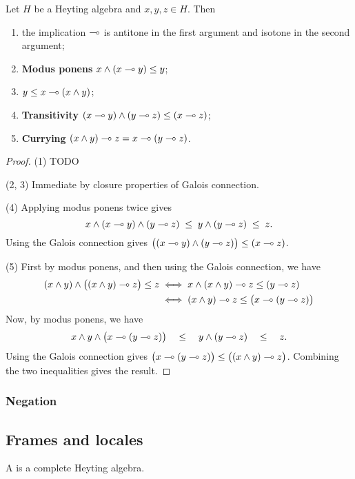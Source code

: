 \begin{lemma}
Let $H$ be a Heyting algebra and $x,y,z\in H$. Then
\begin{enumerate}
\item the implication $\multimap$ is antitone in the first argument and isotone in the second argument;
\item \textbf{Modus ponens} $x\wedge (x\multimap y) \leq y$;
\item $y\leq x \multimap (x\wedge y)$;
\item \textbf{Transitivity} $(x\multimap y)\wedge (y\multimap z) \leq (x\multimap z)$;
\item \textbf{Currying} $(x\wedge y) \multimap z = x \multimap (y\multimap z)$.
\end{enumerate}
\end{lemma}
\begin{proof}
(1) TODO

(2, 3) Immediate by closure properties of Galois connection.

(4) Applying modus ponens twice gives
\[ x \wedge (x\multimap y) \wedge (y\multimap z) \;\leq\; y \wedge (y\multimap z) \;\leq\; z. \]
Using the Galois connection gives $\big((x\multimap y) \wedge (y\multimap z)\big) \leq (x\multimap z)$.

(5) First by modus ponens, and then using the Galois connection, we have
\begin{align*}
(x\wedge y) \wedge \big((x\wedge y)\multimap z\big) \leq z &\iff x\wedge (x\wedge y)\multimap z \leq (y\multimap z) \\
&\iff (x\wedge y)\multimap z \leq \big(x\multimap (y\multimap z)\big)
\end{align*}
Now, by modus ponens, we have
\[ x\wedge y\wedge \big(x \multimap (y\multimap z)\big) \quad\leq\quad y\wedge (y\multimap z) \quad\leq\quad z. \]
Using the Galois connection gives $\big(x \multimap (y\multimap z)\big) \leq \big((x\wedge y)\multimap z\big)$. Combining the two inequalities gives the result.
\end{proof}

\subsubsection{Negation}

\subsection{Frames and locales}
\begin{definition}
A  is a complete Heyting algebra.
\end{definition}

